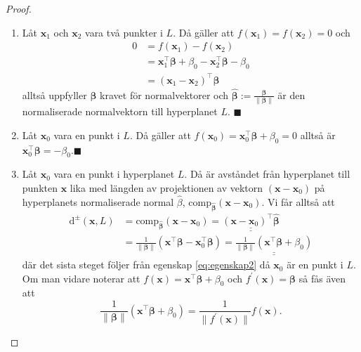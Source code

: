 \documentclass[a4paper, 12pt]{report}
\theoremstyle{definition}
\theoremstyle{remark}
\newcommand{\bfbeta}{{\boldsymbol{\beta}}}
\renewcommand\qedsymbol{$\blacksquare$}
\begin{document}
\begin{proof}
	\leavevmode
\begin{enumerate}
	\item Låt $\mathbf{x}_1$ och $\mathbf{x}_2$ vara två punkter i $L$. Då gäller att $f(\mathbf{x}_1)=f(\mathbf{x}_2)=0$ och
	\begin{align*}
		0 &= f(\mathbf{x}_1)-f(\mathbf{x}_2)\\
		&= \mathbf{x}_1^\intercal \bfbeta + \beta_0 - \mathbf{x}_2^ \intercal \bfbeta - \beta_0\\
		&= (\mathbf{x}_1-\mathbf{x}_2)^\intercal \bfbeta
	\end{align*}
	alltså uppfyller $\bfbeta$ kravet för normalvektorer och $\widehat{\bfbeta}:=\frac{\bfbeta}{\|\bfbeta\|}$ är den normaliserade normalvektorn till hyperplanet $L$. \hfill\qedsymbol
	\item \label{eq:egenskap2}Låt $\mathbf{x}_0$ vara en punkt i $L$. Då gäller att $f(\mathbf{x}_0)=\mathbf{x}_0^\intercal \bfbeta + \beta_0 = 0$ alltså är $\mathbf{x}^\intercal_0 \bfbeta = - \beta_0$.\hfill \qedsymbol
	\item Låt $\mathbf{x}_0$ vara en punkt i hyperplanet $L$. Då är avståndet från hyperplanet till punkten $\mathbf{x}$ lika med längden av projektionen av vektorn $(\mathbf{x}-\mathbf{x}_0)$ på hyperplanets normaliserade normal $\widehat{\beta}$, $\operatorname{comp_{\widehat{\bfbeta}}} ( \mathbf{x} - \mathbf{x}_0 )$. Vi får alltså att
	\begin{align*}
		\operatorname{d^\pm} ( \mathbf{x}, L ) &= \operatorname{comp_{\widehat{\bfbeta}}} ( \mathbf{x} - \mathbf{x}_0 )
		=\underline{\underline{ (\mathbf{x} - \mathbf{x}_0)^\intercal \widehat{\bfbeta} }}\\
		&= \frac{1}{\|\bfbeta\|}(\mathbf{x}^\intercal\bfbeta - \mathbf{x}_0^\intercal\bfbeta)=\underline{\underline{\frac{1}{\|\bfbeta\|}(\mathbf{x}^\intercal\bfbeta + \beta_0)}}
	\end{align*}
	där det sista steget följer från egenskap \ref{eq:egenskap2} då $\mathbf{x}_0$ är en punkt i $L$. Om man vidare noterar att $f(\mathbf{x})=\mathbf{x}^\intercal\bfbeta+\beta_0$ och $f^\prime(\mathbf{x})=\bfbeta$ så fås även att
	\begin{equation*}
		\frac{1}{\|\bfbeta\|}(\mathbf{x}^\intercal\bfbeta + \beta_0)=\frac{1}{\|f^\prime(\mathbf{x})\|}f(\mathbf{x}).
	\end{equation*}
	\qedhere
\end{enumerate}
\end{proof}
\end{document}
